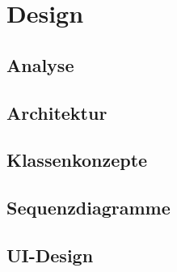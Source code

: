 \chapter{Design}
\label{pd-design}


\section{Analyse}


\section{Architektur}


\section{Klassenkonzepte}


\section{Sequenzdiagramme}


\section{UI-Design}
